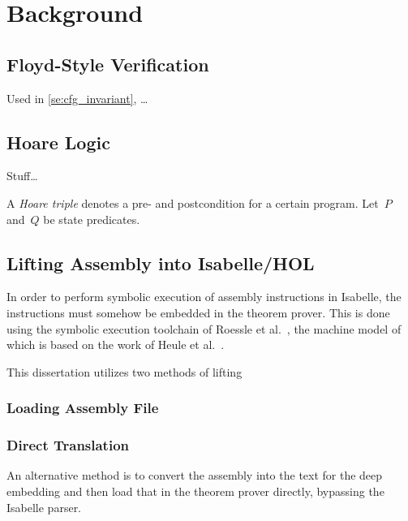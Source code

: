 \chapter{Background}\label{ch:background} 
\section{Floyd-Style Verification}\label{ch:floyd}
Used in \cref{se:cfg_invariant},
\dots

\section{Hoare Logic}
Stuff\dots~\citep{hoare1969axiomatic,myreen2007hoare}

A \emph{Hoare triple} denotes a pre- and postcondition for a certain program.
Let~$P$ and~$Q$ be state predicates.

\section{Lifting Assembly into Isabelle/HOL}

In order to perform symbolic execution of assembly instructions in Isabelle,
the instructions must somehow be embedded in the theorem prover.
This is done using the symbolic execution toolchain
of Roessle et al.~\citep{roessle2019},
the machine model of which is based on the work of Heule et al.~\citep{heule2016}.


This dissertation utilizes two methods of lifting 

\subsection{Loading Assembly File}\label{sse:loading_assembly}

\subsection{Direct Translation}\label{sse:direct_translation}
An alternative method is to convert the assembly into the text for the deep embedding
and then load that in the theorem prover directly,
bypassing the Isabelle parser.
